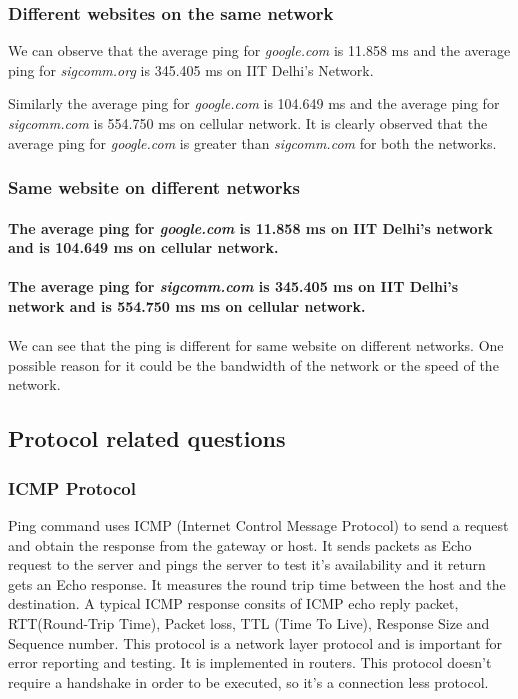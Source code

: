\documentclass{article}
\begin{document}
\subsubsection{Different websites on the same network}

\normalsize
We can observe that the average ping for \textit{google.com} is 11.858 ms and the average ping for \textit{sigcomm.org} is 345.405 ms on IIT Delhi's Network. 

\normalsize
Similarly the average ping for \textit{google.com} is 104.649 ms and the average ping for \textit{sigcomm.com} is 554.750 ms on cellular network. It is clearly observed that the average ping for \textit{google.com} is greater than \textit{sigcomm.com} for both the networks. 


\subsubsection{Same website on different networks}

\paragraph{
\normalsize
The average ping for \textit{google.com} is 11.858 ms  on IIT Delhi's network and is 104.649 ms on cellular network. 
}
\paragraph{
\normalsize
The average ping for \textit{sigcomm.com} is 345.405 ms  on IIT Delhi's network and is 554.750 ms ms on cellular network. 
}

\paragraph{}
\normalsize
We can see that the ping is different for same website on different networks. One possible reason for it could be the bandwidth of the network or the speed of the network.

\subsection{Protocol related questions}
\subsubsection{ICMP Protocol}
\normalsize
\noindent
Ping command uses ICMP (Internet Control Message Protocol) to send a request and obtain the response from the gateway or host. It sends packets as Echo request to the server and pings the server to test it's availability and it return gets an Echo response. It measures the round trip time between the host and the destination. A typical ICMP response consits of ICMP echo reply packet, RTT(Round-Trip Time), Packet loss, TTL (Time To Live), Response Size and Sequence number. This protocol is a network layer protocol and is important for error reporting and testing. It is implemented in routers. This protocol doesn't require a handshake in order to be executed, so it's a connection less protocol.
\end{document}
